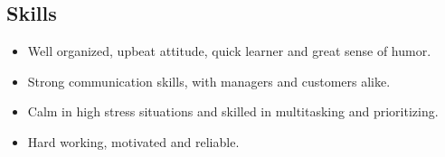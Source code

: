 \documentclass[oneside, final]{scrartcl}
\begin{document}
\begin{center}
\begin{comment}
    \section{Education}
    Guilderland High School\hfill 2004 - 2008\\
    High School Diploma\hfill Albany, NY\\
\end{comment}

\section{Skills}
\begin{itemize}
	\setlength{\itemsep}{1pt}
	\setlength{\parskip}{0pt}
	\setlength{\parsep}{0pt}
	\setlength{\leftmargin}{-5mm}
    \item Well organized, upbeat attitude, quick learner and great sense of humor.
    \item Strong communication skills, with managers and customers alike.
    \item Calm in high stress situations and skilled in multitasking and prioritizing.
    \item Hard working, motivated and reliable.
\end{itemize}

\end{center}
\end{document}
